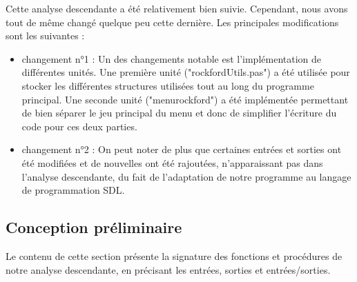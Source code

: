         Cette analyse descendante a été relativement bien suivie. Cependant, nous avons tout de même changé quelque peu cette dernière. Les principales modifications sont les suivantes : 
        \\
        \begin{itemize}
            \item changement n°1 :
            Un des changements notable est l'implémentation de différentes unités. Une première unité ("rockfordUtils.pas") a été utilisée pour stocker les différentes structures utilisées tout au long du programme principal. Une seconde unité ("menurockford") a été implémentée permettant de bien séparer le jeu principal du menu et donc de simplifier l'écriture du code pour ces deux parties.
            \\
            \item changement n°2 :
            On peut noter de plus que certaines entrées et sorties ont été modifiées et de nouvelles ont été rajoutées, n'apparaissant pas dans l'analyse descendante, du fait de l'adaptation de notre programme au langage de programmation SDL.
            \\
        
        \end{itemize}
    
    \newpage
    \subsection{Conception préliminaire}
        Le contenu de cette section présente la signature des fonctions et procédures de notre analyse descendante, en précisant les entrées, sorties et entrées/sorties.
        
